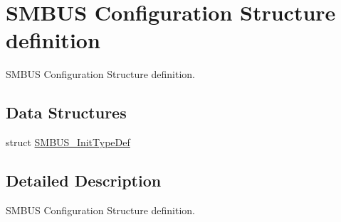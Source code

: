 \hypertarget{group___s_m_b_u_s___configuration___structure__definition}{}\section{S\+M\+B\+US Configuration Structure definition}
\label{group___s_m_b_u_s___configuration___structure__definition}


S\+M\+B\+US Configuration Structure definition.  


\subsection*{Data Structures}
\begin{DoxyCompactItemize}
\item 
struct \hyperlink{struct_s_m_b_u_s___init_type_def}{S\+M\+B\+U\+S\+\_\+\+Init\+Type\+Def}
\end{DoxyCompactItemize}


\subsection{Detailed Description}
S\+M\+B\+US Configuration Structure definition. 

